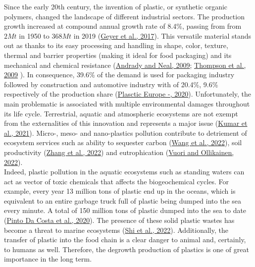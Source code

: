 \documentclass[]{elsarticle} %
\begin{document}
Since the early 20th century, the invention of plastic, or synthetic organic polymers, changed the landscape of different industrial sectors.
The production growth increased at compound annual growth rate of 8.4\%, passing from from \(2Mt\) in 1950 to \(368Mt\) in 2019 (\protect\hyperlink{ref-Geyer2017}{Geyer et al., 2017}).
This versatile material stands out as thanks to its easy processing and handling in shape, color, texture, thermal and barrier properties (making it ideal for food packaging) and its mechanical and chemical resistance (\protect\hyperlink{ref-Andrady2009}{Andrady and Neal, 2009}; \protect\hyperlink{ref-Thompson2009a}{Thompson et al., 2009} ).
In consequence, 39.6\% of the demand is used for packaging industry followed by construction and automotive industry with of 20.4\%, 9.6\% respectively of the production share (\protect\hyperlink{ref-PlascticEurope2020}{Plasctic Europe -, 2020}).
Unfortunately, the main problematic is associated with multiple environmental damages throughout its life cycle.
Terrestrial, aquatic and atmospheric ecosystems are not exempt from the externalities of this innovation and represents a major issue (\protect\hyperlink{ref-Kumar2021}{Kumar et al., 2021}).
Micro-, meso- and nano-plastics pollution contribute to detriement of ecosystem services such as ability to sequester carbon (\protect\hyperlink{ref-wang2022a}{Wang et al., 2022}), soil productivity (\protect\hyperlink{ref-zhang2022b}{Zhang et al., 2022}) and eutrophication (\protect\hyperlink{ref-vuori2022}{Vuori and Ollikainen, 2022}).\\
Indeed, plastic pollution in the aquatic ecosystems such as standing waters can act as vector of toxic chemicals that affects the biogeochemical cycles.
For example, every year 13 million tons of plastic end up in the oceans, which is equivalent to an entire garbage truck full of plastic being dumped into the sea every minute.
A total of 150 million tons of plastic dumped into the sea to date (\protect\hyperlink{ref-pintodacosta2020}{Pinto Da Costa et al., 2020}).
The presence of these solid plastic wastes has become a threat to marine ecosystems (\protect\hyperlink{ref-shi2022}{Shi et al., 2022}).
Additionally, the transfer of plastic into the food chain is a clear danger to animal and, certainly, to humans as well.
Therefore, the degrowth production of plastics is one of great importance in the long term.
\end{document}
